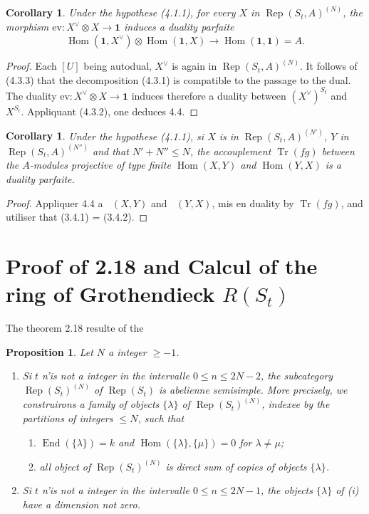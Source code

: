 \documentclass[11pt,a4paper]{article}
\theoremstyle{plain}
\newtheorem{proposition}[theorem]{Proposition}
\newtheorem{corollary}[theorem]{Corollary}
\theoremstyle{definition}
\DeclareMathOperator{\Hom}{Hom}
\DeclareMathOperator{\End}{End}
\DeclareMathOperator{\Tr}{Tr}
\DeclareMathOperator{\Rep}{Rep}
\newcommand{\ev}{\mathrm{ev}}
\DeclareMathOperator{\iHom}{\underline{Hom}}
\begin{document}
\begin{corollary}
Under the hypothese (4.1.1), for every $X$ in $\Rep(S_t, A)^{(N)}$, the morphism $\ev : X^\vee \otimes X \to \mathbf{1}$ induces a duality parfaite
\[
\Hom(\mathbf{1}, X^\vee) \otimes \Hom(\mathbf{1}, X) \to \Hom(\mathbf{1}, \mathbf{1}) = A.
\]
\end{corollary}

\begin{proof}
Each $[U]$ being autodual, $X^\vee$ is again in $\Rep(S_t, A)^{(N)}$. It follows of (4.3.3) that the decomposition (4.3.1) is compatible to the passage to the dual. The duality $\ev : X^\vee \otimes X \to \mathbf{1}$ induces therefore a duality between $(X^\vee)^{S_t}$ and $X^{S_t}$. Appliquant (4.3.2), one deduces 4.4.
\end{proof}

\begin{corollary}
Under the hypothese (4.1.1), si $X$ is in $\Rep(S_t, A)^{(N')}$, $Y$ in $\Rep(S_t, A)^{(N'')}$ and that $N' + N'' \leq N$, the accouplement $\Tr(fg)$ between the $A$-modules projective of type finite $\Hom(X, Y)$ and $\Hom(Y, X)$ is a duality parfaite.
\end{corollary}

\begin{proof}
Appliquer 4.4 a $\iHom(X, Y)$ and $\iHom(Y, X)$, mis en duality by $\Tr(fg)$, and utiliser that (3.4.1) = (3.4.2).
\end{proof}


\section{Proof of 2.18 and Calcul of the ring of Grothendieck $R(S_t)$}

The theorem 2.18 resulte of the

\begin{proposition}
Let $N$ a integer $\geq -1$.
\begin{enumerate}[label=(\roman*)]
\item Si $t$ n'is not a integer in the intervalle $0 \leq n \leq 2N-2$, the subcategory $\Rep(S_t)^{(N)}$ of $\Rep(S_t)$ is abelienne semisimple. More precisely, we construirons a family of objects $\{\lambda\}$ of $\Rep(S_t)^{(N)}$, indexee by the partitions of integers $\leq N$, such that
\begin{enumerate}[label=(\alph*)]
\item $\End(\{\lambda\}) = k$ and $\Hom(\{\lambda\}, \{\mu\}) = 0$ for $\lambda \neq \mu$;
\item all object of $\Rep(S_t)^{(N)}$ is direct sum of copies of objects $\{\lambda\}$.
\end{enumerate}
\item Si $t$ n'is not a integer in the intervalle $0 \leq n \leq 2N-1$, the objects $\{\lambda\}$ of (i) have a dimension not zero.
\end{enumerate}
\end{proposition}
\end{document}
